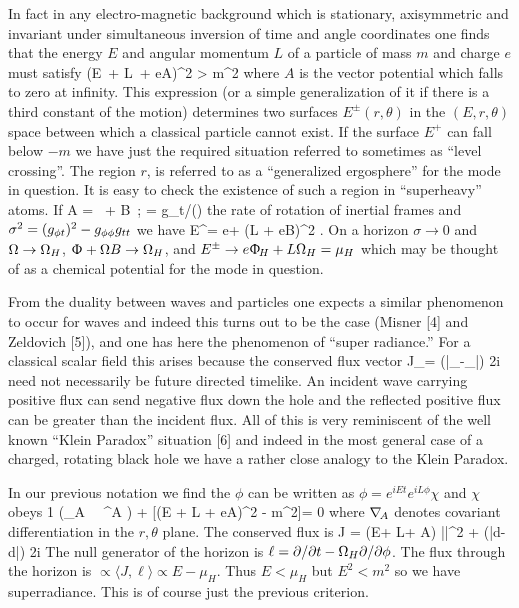 In fact in any electro-magnetic background which is stationary, axisymmetric and
invariant under simultaneous inversion of time and angle coordinates one finds that the
energy $E$ and angular momentum $L$ of a particle of mass $m$ and charge $e$ must satisfy
\be
(E\, \dt + L\, \dphi + eA)^2 > m^2
\ee
where $A$ is the vector potential which falls to zero at infinity.
This expression (or a simple generalization of it if there is a third constant of the motion)
determines two surfaces $E^{\pm} (r,\theta)$ in the $(E, r, \theta)$ space between which
a classical particle cannot exist. If the surface $E^+$ can fall below $- m$ we have just the
required situation referred to sometimes as ``level crossing''. The region $r$,
is referred to as a ``generalized ergosphere'' for the mode in question.
It is easy to check the existence of such a region in ``superheavy'' atoms. If
\be
A = \Phi\, \dt + B\, \dphi; \quad \Omega = g_{\phi t}/(\gtt)
\ee
the rate of rotation of inertial frames and $\sigma^2 = (g_{\phi t})^2 - g_{\phi\phi}g_{tt}$ we have
\be
E^\pm = e\mathop\Phi + (L + eB)\Omega \pm \sigma^2  .
\ee
\ni
On a horizon $\sigma\rightarrow 0$ and $\Omega \rightarrow \Omega_H$, $\Upphi + \Omega B \rightarrow \Omega_H$, and
$E^\pm \rightarrow e \Upphi_{\!H} + L \Omega_H = \mu_H$
which may be thought of as a chemical potential for the mode in question.

From the duality between waves and particles one expects a similar phenomenon to occur for waves and indeed this turns out to be the case (Misner [4] and Zeldovich [5]), and one has here the phenomenon of ``super radiance.'' For a classical scalar ﬁeld this arises because the conserved flux vector
\be
J_\mu = {(\bar\phi\grad_{\!\mu}\phi-\phi\grad_{\!\mu}\bar\phi) \over 2i}
\ee
need not necessarily be future directed timelike. An incident wave carrying positive flux can send negative flux down the hole and the reflected positive flux can be greater than the incident flux. All of this is very reminiscent of the well known ``Klein Paradox'' situation [6] and indeed in the most general case of a charged, rotating black hole we have a rather close analogy to the Klein Paradox. 

In our previous notation we find the $\phi$ can be written as $\phi = e^{iEt}e^{iL\phi}\chi$ and $\chi$ obeys
\be
{1 \over \sigma}(\grad_A \, \sigma \, \grad^A \chi) + {[(E \dt + L \dphi + eA)^2 - m^2]}\chi = 0
\ee
where $\grad_A$ denotes covariant differentiation in the $r, \theta$ plane. The conserved flux is
\be
J = (E\dt + L\dphi + A) |\chi|^2 + {(\bar\chi d\chi - \chi d\bar\chi) \over 2i}
\ee
The null generator of the horizon is $\ell = \partial / \partial t - \Omega_H \partial/\partial\phi$.
The flux through the horizon is $\propto \langle J, \ell \rangle \propto E - \mu_H$. Thus $E < \mu_H$
but $E^2 < m^2$ so we have superradiance. This is of course just the previous criterion.


